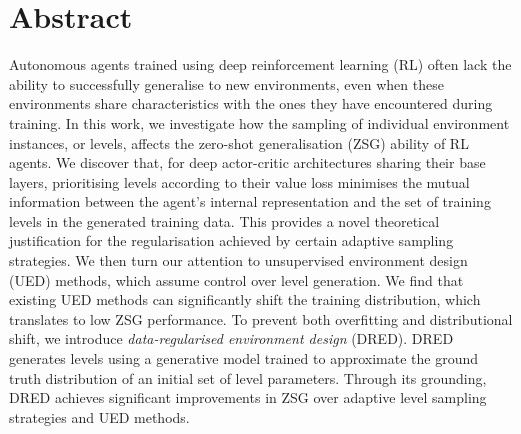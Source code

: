 \graphicspath{{chapter3_dred/paper/}{chapter3_dred/paper/content/}{chapter3_dred/paper/app_content/}}
\renewcommand{\lvl}{i}

\algrenewcommand\algorithmicindent{1.0em}
\algrenewcommand{}
\algrenewcommand{}
\def\Input{\Require}
\def\Output{\Ensure}
\newcommand{\rulesep}{\unskip\ \vrule\ }
\newlength{\twosubht}
\newsavebox{\twosubbox}

\section{Abstract}
Autonomous agents trained using deep reinforcement learning (RL) often lack the ability to successfully generalise to new environments, even when these environments share characteristics with the ones they have encountered during training. In this work, we investigate how the sampling of individual environment instances, or levels, affects the zero-shot generalisation (ZSG) ability of RL agents. We discover that, for deep actor-critic architectures sharing their base layers, prioritising levels according to their value loss minimises the mutual information between the agent's internal representation and the set of training levels in the generated training data. This provides a novel theoretical justification for the regularisation achieved by certain adaptive sampling strategies. We then turn our attention to unsupervised environment design (UED) methods, which assume control over level generation. We find that existing UED methods can significantly shift the training distribution, which translates to low ZSG performance. To prevent both overfitting and distributional shift, we introduce \textit{data-regularised environment design} (DRED). DRED generates levels using a generative model trained to approximate the ground truth distribution of an initial set of level parameters. Through its grounding, DRED achieves significant improvements in ZSG over adaptive level sampling strategies and UED methods.

